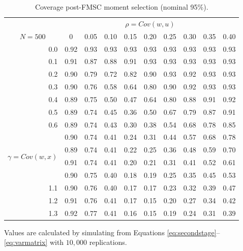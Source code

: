 \documentclass[12pt]{article}
\theoremstyle{definition}
\begin{document}
%
\begin{table}[!tbp]
 \begin{center}
 \caption{Coverage post-FMSC moment selection (nominal 95\%).}
\label{tab:FMSCconf}
\small
 \begin{tabular}{r|rrrrrrrrr}\hline\hline
&\multicolumn{9}{c}{$\rho = Cov(w,u)$}\\
\multicolumn{1}{c|}{$N=500$}&\multicolumn{1}{c}{0}&\multicolumn{1}{c}{0.05}&\multicolumn{1}{c}{0.10}&\multicolumn{1}{c}{0.15}&\multicolumn{1}{c}{0.20}&\multicolumn{1}{c}{0.25}&\multicolumn{1}{c}{0.30}&\multicolumn{1}{c}{0.35}&\multicolumn{1}{c}{0.40}\tabularnewline
\hline
0.0&0.92&0.93&0.93&0.93&0.93&0.93&0.93&0.93&0.93\tabularnewline
0.1&0.91&0.87&0.88&0.91&0.93&0.93&0.93&0.93&0.93\tabularnewline
0.2&0.90&0.79&0.72&0.82&0.90&0.93&0.92&0.93&0.93\tabularnewline
0.3&0.90&0.76&0.58&0.64&0.80&0.90&0.92&0.93&0.93\tabularnewline
0.4&0.89&0.75&0.50&0.47&0.64&0.80&0.88&0.91&0.92\tabularnewline
0.5&0.89&0.74&0.45&0.36&0.50&0.67&0.79&0.87&0.91\tabularnewline
0.6&0.89&0.74&0.43&0.30&0.38&0.54&0.68&0.78&0.85\tabularnewline
\multirow{4}{5mm}{\begin{sideways}\parbox{1mm}{$\gamma\;$=$\;Cov(w,x)$}\end{sideways}}
0.7&0.90&0.74&0.41&0.24&0.31&0.44&0.57&0.68&0.78\tabularnewline
0.8&0.89&0.74&0.41&0.22&0.25&0.36&0.48&0.59&0.70\tabularnewline
0.9&0.91&0.74&0.41&0.20&0.21&0.31&0.41&0.52&0.61\tabularnewline
1.0&0.90&0.75&0.40&0.18&0.19&0.25&0.35&0.45&0.53\tabularnewline
1.1&0.90&0.76&0.40&0.17&0.17&0.23&0.32&0.39&0.47\tabularnewline
1.2&0.91&0.76&0.41&0.17&0.15&0.20&0.27&0.34&0.42\tabularnewline
1.3&0.92&0.77&0.41&0.16&0.15&0.19&0.24&0.31&0.39\tabularnewline
\hline
\end{tabular}
\end{center}
\footnotesize
\begin{tablenotes}
\item Values are calculated by simulating from Equations \ref{eq:secondstage}--\ref{eq:varmatrix} with $10,000$ replications.
\end{tablenotes}
\end{table}
\end{document}
